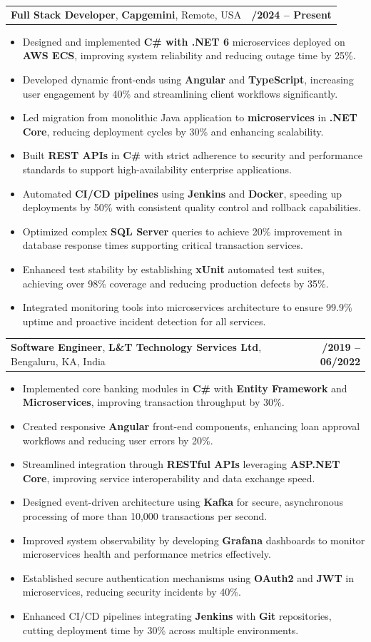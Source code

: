 \documentclass[letterpaper,11pt]{article}
\makeatletter
\newcommand{\resumeItem}[1]{
  \item\footnotesize{
    {#1 \vspace{-2pt}}
  }
}
\newcommand{\resumeSubheading}[4]{
  \vspace{-2pt}\item
    \begin{tabular*}{1.0\textwidth}[t]{l@{\extracolsep{\fill}}r}
      \textbf{\fontsize{10pt}{14pt}\selectfont #3}, \textbf{\fontsize{10pt}{14pt}\selectfont #1}, \fontsize{10pt}{14pt}\selectfont #4 & \textbf{\fontsize{10pt}{14pt}\selectfont #2} \\
    \end{tabular*}\vspace{-7pt}
}
\newcommand{\resumeItemListStart}{\begin{itemize}[leftmargin=*]}
\newcommand{\resumeItemListEnd}{\end{itemize}\vspace{-5pt}}
\makeatother
\begin{document}
    \resumeSubheading
        {Capgemini}{01/2024 -- Present}
        {Full Stack Developer}{Remote, USA}
      \resumeItemListStart
        \resumeItem{Designed and implemented \textbf{C\# with .NET 6} microservices deployed on \textbf{AWS ECS}, improving system reliability and reducing outage time by 25\%.}
        \resumeItem{Developed dynamic front-ends using \textbf{Angular} and \textbf{TypeScript}, increasing user engagement by 40\% and streamlining client workflows significantly.}
        \resumeItem{Led migration from monolithic Java application to \textbf{microservices} in \textbf{.NET Core}, reducing deployment cycles by 30\% and enhancing scalability.}
        \resumeItem{Built \textbf{REST APIs} in \textbf{C\#} with strict adherence to security and performance standards to support high-availability enterprise applications.}
        \resumeItem{Automated \textbf{CI/CD pipelines} using \textbf{Jenkins} and \textbf{Docker}, speeding up deployments by 50\% with consistent quality control and rollback capabilities.}
        \resumeItem{Optimized complex \textbf{SQL Server} queries to achieve 20\% improvement in database response times supporting critical transaction services.}
        \resumeItem{Enhanced test stability by establishing \textbf{xUnit} automated test suites, achieving over 98\% coverage and reducing production defects by 35\%.}
        \resumeItem{Integrated monitoring tools into microservices architecture to ensure 99.9\% uptime and proactive incident detection for all services.}
      \resumeItemListEnd

    \resumeSubheading
        {L\&T Technology Services Ltd}{08/2019 -- 06/2022}
        {Software Engineer}{Bengaluru, KA, India}
      \resumeItemListStart
        \resumeItem{Implemented core banking modules in \textbf{C\#} with \textbf{Entity Framework} and \textbf{Microservices}, improving transaction throughput by 30\%.}
        \resumeItem{Created responsive \textbf{Angular} front-end components, enhancing loan approval workflows and reducing user errors by 20\%.}
        \resumeItem{Streamlined integration through \textbf{RESTful APIs} leveraging \textbf{ASP.NET Core}, improving service interoperability and data exchange speed.}
        \resumeItem{Designed event-driven architecture using \textbf{Kafka} for secure, asynchronous processing of more than 10,000 transactions per second.}
        \resumeItem{Improved system observability by developing \textbf{Grafana} dashboards to monitor microservices health and performance metrics effectively.}
        \resumeItem{Established secure authentication mechanisms using \textbf{OAuth2} and \textbf{JWT} in microservices, reducing security incidents by 40\%.}
        \resumeItem{Enhanced CI/CD pipelines integrating \textbf{Jenkins} with \textbf{Git} repositories, cutting deployment time by 30\% across multiple environments.}
      \resumeItemListEnd
\end{document}
